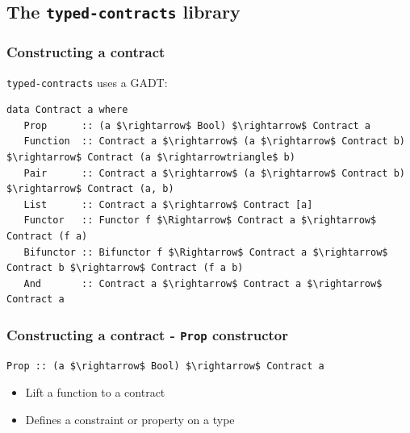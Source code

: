 \documentclass[]{beamer}
\begin{document}

\subsection{The \texttt{typed-contracts} library}

\begin{frame}[fragile]
\frametitle{Constructing a contract}

\texttt{typed-contracts} uses a GADT:

\begin{lstlisting}[mathescape]
data Contract a where
   Prop      :: (a $\rightarrow$ Bool) $\rightarrow$ Contract a
   Function  :: Contract a $\rightarrow$ (a $\rightarrow$ Contract b) $\rightarrow$ Contract (a $\rightarrowtriangle$ b)
   Pair      :: Contract a $\rightarrow$ (a $\rightarrow$ Contract b) $\rightarrow$ Contract (a, b)
   List      :: Contract a $\rightarrow$ Contract [a]
   Functor   :: Functor f $\Rightarrow$ Contract a $\rightarrow$ Contract (f a)
   Bifunctor :: Bifunctor f $\Rightarrow$ Contract a $\rightarrow$ Contract b $\rightarrow$ Contract (f a b)
   And       :: Contract a $\rightarrow$ Contract a $\rightarrow$ Contract a
\end{lstlisting}

\end{frame}

\begin{frame}[fragile]
\frametitle{Constructing a contract - \texttt{Prop} constructor}

\begin{lstlisting}[mathescape]
Prop :: (a $\rightarrow$ Bool) $\rightarrow$ Contract a
\end{lstlisting}

\begin{itemize}
	\item Lift a function to a contract
	\item Defines a constraint or property on a type
\end{itemize}

\end{frame}
\end{document}
